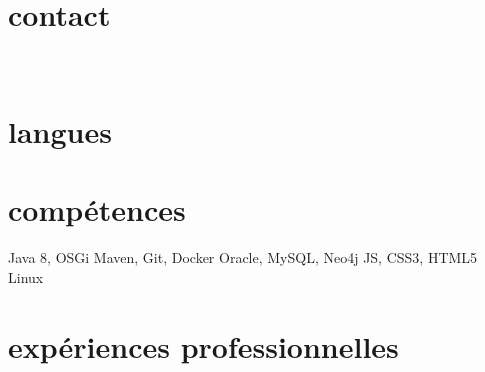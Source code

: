 \documentclass{friggeri-cv} 	%
\begin{document}


\begin{aside} %
\section{contact}
\myAddress
~
\myPhoneNumber
\myReferences
\section{langues}
\myLanguages
\section{compétences}
Java 8, OSGi
Maven, Git, Docker
Oracle, MySQL, Neo4j
JS, CSS3, HTML5
Linux
\end{aside}

\section{expériences professionnelles}
\end{document}
